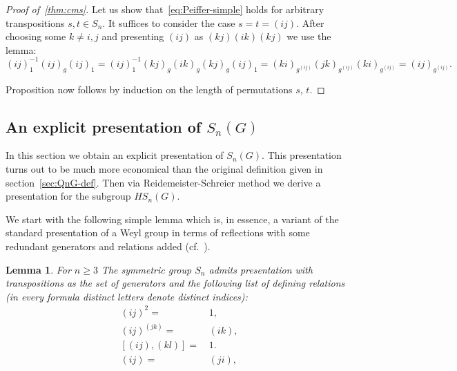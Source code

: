 \documentclass[oneside, 12pt]{amsart}
\theoremstyle{plain}
\numberwithin{equation}{section}
\newtheorem{lemma}{Lemma}
\numberwithin{lemma}{section}
\theoremstyle{remark}
\theoremstyle{definition}
\begin{document}
\begin{proof}[Proof of~\cref{thm:cms}]
Let us show that~\eqref{eq:Peiffer-simple} holds for arbitrary transpositions $s, t \in S_n$.
It suffices to consider the case $s=t=(ij)$. 
After choosing some $k\neq i,j$ and presenting $(ij)$ as $(kj)(ik)(kj)$ we use the lemma:
\begin{equation} \nonumber (ij)^{-1}_1 (ij)_g (ij)_1 = (ij)^{-1}_1 (kj)_g (ik)_g (kj)_g (ij)_1 =
(ki)_{g^{(ij)}} (jk)_{g^{(ij)}} (ki)_{g^{(ij)}} = (ij)_{g^{(ij)}}. \end{equation}

Proposition now follows by induction on the length of permutations $s$, $t$.
\end{proof}

\subsection{An explicit presentation of $S_n(G)$}
In this section we obtain an explicit presentation of $S_n(G)$. %
This presentation turns out to be much more economical than the original definition given in section~\ref{sec:QnG-def}.
Then via Reidemeister-Schreier method we derive a presentation for the subgroup $HS_n(G)$.

We start with the following simple lemma which is, in essence, a variant of the standard presentation of a Weyl group in terms of reflections
 with some redundant generators and relations added (cf.~\cite[Theorem~2.4.3]{Ca89}).
\begin{lemma} \label{lm:Snpres} For $n\geq 3$ The symmetric group $S_n$ admits presentation with 
transpositions as the set of generators and the following list of defining relations
(in every formula distinct letters denote distinct indices):
\begin{align}
(ij)^2 = &\, 1,         \label{Sym1} \tag{S1} \\
(ij)^{(jk)} = &\, (ik), \label{Sym2} \tag{S2} \\
[(ij), (kl)] = &\,1.    \label{Sym3} \tag{S3} \\
(ij) =&\, (ji),         \label{Sym0} \tag{S4}
\end{align}
\end{lemma}

 
\end{document}
